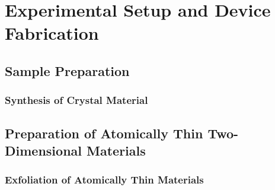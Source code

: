 \graphicspath{{./figs/chap2/}} %
\chapter{Experimental Setup and Device Fabrication}\label{chap:two}

\section{Sample Preparation}\label{sec:sample_prep}
\subsection{Synthesis of Crystal Material}\label{subsec:crystal_synthesis}

\section{Preparation of Atomically Thin Two-Dimensional Materials}\label{sec:prep_of_samples}
\subsection{Exfoliation of Atomically Thin Materials}\label{subsec:exfoliation}

